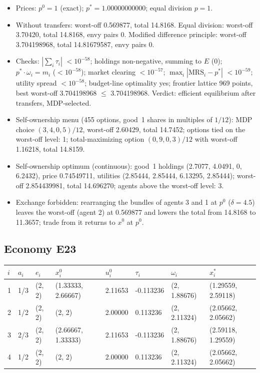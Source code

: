 \begin{itemize}[leftmargin=1.2em,itemsep=0pt,topsep=2pt]\footnotesize
\item Prices: $p^0 = 1$ (exact); $p^* = 1.00000000000$; equal division $p = 1$.
\item Without transfers: worst-off 0.569877, total 14.8168. Equal division: worst-off 3.70420, total 14.8168, envy pairs 0. Modified difference principle: worst-off 3.704198968, total 14.81679587, envy pairs 0.
\item Checks: $|\sum_i\tau_i|$ $<10^{-58}$; holdings non-negative, summing to $E$ (0); $p^*\cdot\omega_i = m_i$ ($<10^{-58}$); market clearing $<10^{-57}$; $\max_i|\mathrm{MRS}_i - p^*|$ $<10^{-59}$; utility spread $<10^{-58}$; budget-line optimality yes; frontier lattice 969 points, best worst-off 3.704198968 $\leq$ 3.704198968. Verdict: efficient equilibrium after transfers, MDP-selected.
\item Self-ownership menu (455 options, good~1 shares in multiples of $1/12$): MDP choice $(3, 4, 0, 5)/12$, worst-off 2.60429, total 14.7452; options tied on the worst-off level: 1; total-maximizing option $(0, 9, 0, 3)/12$ with worst-off 1.16218, total 14.8159.
\item Self-ownership optimum (continuous): good~1 holdings (2.7077, 4.0491, 0, 6.2432), price 0.74549711, utilities (2.85444, 2.85444, 6.13295, 2.85444); worst-off 2.854439981, total 14.696270; agents above the worst-off level: 3.
\item Exchange forbidden: rearranging the bundles of agents 3 and 1 at $p^0$ ($\delta = 4.5$) leaves the worst-off (agent 2) at 0.569877 and lowers the total from 14.8168 to 11.3657; trade from it returns to $x^0$ at $p^0$.
\end{itemize}

\subsection*{Economy E23}
\label{ec:E23}
{\scriptsize\setlength{\tabcolsep}{3pt}
\begin{tabular}{@{}llllllll@{}}
\toprule
$i$ & $a_i$ & $e_i$ & $x^0_i$ & $u^0_i$ & $\tau_i$ & $\omega_i$ & $x^*_i$ \\
\midrule
1 & 1/3 & (2, 2) & (1.33333, 2.66667) & 2.11653 & -0.113236 & (2, 1.88676) & (1.29559, 2.59118) \\
2 & 1/2 & (2, 2) & (2, 2) & 2.00000 & 0.113236 & (2, 2.11324) & (2.05662, 2.05662) \\
3 & 2/3 & (2, 2) & (2.66667, 1.33333) & 2.11653 & -0.113236 & (2, 1.88676) & (2.59118, 1.29559) \\
4 & 1/2 & (2, 2) & (2, 2) & 2.00000 & 0.113236 & (2, 2.11324) & (2.05662, 2.05662) \\
\bottomrule\end{tabular}}

